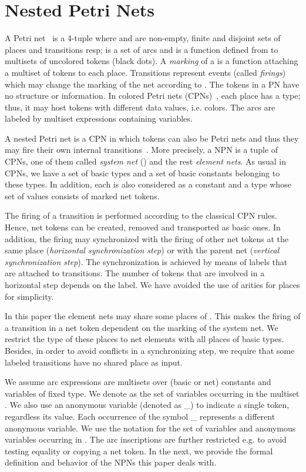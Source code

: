 \documentclass{llncs}
\begin{document}
\section{Nested Petri Nets}
\label{sec:npn}

A Petri net~\cite{Murata89} is a 4-tuple  where  and  are non-empty, finite and disjoint sets of places and transitions resp;  is a set of arcs and  is a function defined from  to multisets of uncolored tokens (black dots). A \emph{marking} of a  is a function attaching a multiset of tokens to each place. Transitions represent events (called \emph{firings}) which may change the marking of the net according to . The tokens in a PN have no structure or information. In colored Petri nets (CPNs)~\cite{Jensen92}, each place has a type; thus, it may host tokens with different data values, i.e. colors. The arcs are labeled by multiset expressions containing variables.

A nested Petri net is a CPN in which tokens can also be Petri nets and thus they may fire their own internal transitions~\cite{Lomazova01}. More precisely, a NPN is a tuple  of CPNs, one of them called \emph{system net} () and the rest \emph{element nets}. As usual in CPNs, we have a set of basic types  and a set of basic constants  belonging to these types. In addition, each  is also considered as a constant and a type whose set of values consists of marked net tokens.

The firing of a transition  is performed according to the classical CPN rules. Hence, net tokens can be created, removed and transported as basic ones. In addition,  the firing may synchronized with the firing of other net tokens at the same place (\emph{horizontal synchronization step}) or with the parent net (\emph{vertical synchronization step}). The synchronization is achieved by means of labels that are attached to transitions. The number of tokens that are involved in a horizontal step depends on the label. We have avoided the use of arities for places for simplicity. 


In this paper the element nets may share some places of . This makes the firing of a transition in a net token dependent on the marking of the system net. We restrict the type of these places to net elements with all places of basic types. Besides, in order to avoid conflicts in a synchronizing step, we require that some labeled transitions have no shared place as input.


We assume arc expressions are multisets over (basic or net) constants and variables of fixed type. We denote as  the set of variables occurring in the multiset . We also use an anonymous variable (denoted as \_) to indicate a single token, regardless its value. Each occurrence of the symbol \_ represents a different anonymous variable. We use the notation  for the set of variables and anonymous variables occurring in . The arc inscriptions are further restricted e.g. to avoid testing equality or copying a net token. In the next, we provide  the formal definition and behavior of the NPNs this paper deals with.
\end{document}
